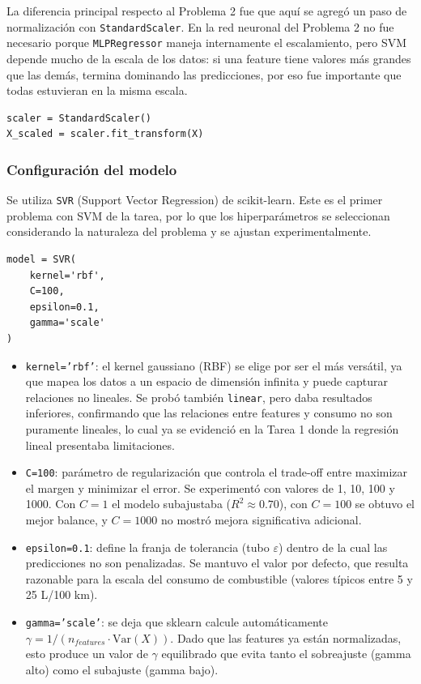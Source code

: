 \documentclass{article}
\begin{document}
La diferencia principal respecto al Problema 2 fue que aquí se agregó un paso de normalización con \texttt{StandardScaler}. En la red neuronal del Problema 2 no fue necesario porque \texttt{MLPRegressor} maneja internamente el escalamiento, pero SVM depende mucho de la escala de los datos: si una feature tiene valores más grandes que las demás, termina dominando las predicciones, por eso fue importante que todas estuvieran en la misma escala.

\begin{lstlisting}
scaler = StandardScaler()
X_scaled = scaler.fit_transform(X)
\end{lstlisting}

\subsubsection{Configuración del modelo}

Se utiliza \texttt{SVR} (Support Vector Regression) de scikit-learn. Este es el primer problema con SVM de la tarea, por lo que los hiperparámetros se seleccionan considerando la naturaleza del problema y se ajustan experimentalmente.

\begin{lstlisting}
model = SVR(
    kernel='rbf',
    C=100,
    epsilon=0.1,
    gamma='scale'
)
\end{lstlisting}

\begin{itemize}
    \item \texttt{kernel='rbf'}: el kernel gaussiano (RBF) se elige por ser el más versátil, ya que mapea los datos a un espacio de dimensión infinita y puede capturar relaciones no lineales. Se probó también \texttt{linear}, pero daba resultados inferiores, confirmando que las relaciones entre features y consumo no son puramente lineales, lo cual ya se evidenció en la Tarea 1 donde la regresión lineal presentaba limitaciones.
    \item \texttt{C=100}: parámetro de regularización que controla el trade-off entre maximizar el margen y minimizar el error. Se experimentó con valores de 1, 10, 100 y 1000. Con $C=1$ el modelo subajustaba ($R^2 \approx 0.70$), con $C=100$ se obtuvo el mejor balance, y $C=1000$ no mostró mejora significativa adicional.
    \item \texttt{epsilon=0.1}: define la franja de tolerancia (tubo $\varepsilon$) dentro de la cual las predicciones no son penalizadas. Se mantuvo el valor por defecto, que resulta razonable para la escala del consumo de combustible (valores típicos entre 5 y 25 L/100 km).
    \item \texttt{gamma='scale'}: se deja que sklearn calcule automáticamente $\gamma = 1/(n_{features} \cdot \text{Var}(X))$. Dado que las features ya están normalizadas, esto produce un valor de $\gamma$ equilibrado que evita tanto el sobreajuste (gamma alto) como el subajuste (gamma bajo).
\end{itemize}
\end{document}
